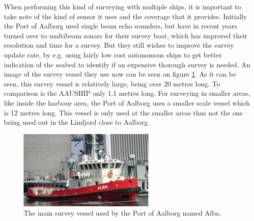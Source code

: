 When performing this kind of surveying with multiple ships, it is important to take note of the kind of sensor it uses and the coverage that it provides. Initially the Port of Aalborg used single beam echo sounders, but have in recent years turned over to multibeam sonars for their survey boat, which has improved their resolution and time for a survey. But they still wishes to improve the survey update rate, by e.g. using fairly low cost autonomous ships to get better indication of the seabed to identify if an expensive thorough survey is needed. An image of the survey vessel they use now can be seen on figure \ref{fig:alba}. As it can be seen, this survey vessel is relatively large, being over 20 metres long. To comparison is the AAUSHIP only 1.1 metres long. For surveying in smaller areas, like inside the harbour area, the Port of Aalborg uses a smaller scale vessel which is 12 metres long. This vessel is only used at the smaller areas thus not the one being used out in the Limfjord close to Aalborg.
\begin{figure}
	\centering
	\includegraphics[width=0.6\textwidth]{fig/alba}
	\caption{The main survey vessel used by the Port of Aalborg named Alba.}
	\label{fig:alba}
\end{figure}



